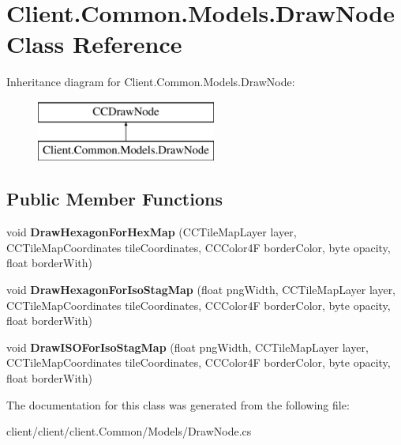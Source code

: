 \hypertarget{classClient_1_1Common_1_1Models_1_1DrawNode}{\section{Client.\-Common.\-Models.\-Draw\-Node Class Reference}
\label{classClient_1_1Common_1_1Models_1_1DrawNode}
}
Inheritance diagram for Client.\-Common.\-Models.\-Draw\-Node\-:\begin{figure}[H]
\begin{center}
\leavevmode
\includegraphics[height=2.000000cm]{classClient_1_1Common_1_1Models_1_1DrawNode}
\end{center}
\end{figure}
\subsection*{Public Member Functions}
\begin{DoxyCompactItemize}
\item 
\hypertarget{classClient_1_1Common_1_1Models_1_1DrawNode_a8acad135d936298475940d5ba6b5e4d1}{void {\bfseries Draw\-Hexagon\-For\-Hex\-Map} (C\-C\-Tile\-Map\-Layer layer, C\-C\-Tile\-Map\-Coordinates tile\-Coordinates, C\-C\-Color4\-F border\-Color, byte opacity, float border\-With)}\label{classClient_1_1Common_1_1Models_1_1DrawNode_a8acad135d936298475940d5ba6b5e4d1}

\item 
\hypertarget{classClient_1_1Common_1_1Models_1_1DrawNode_af759c63ae3fc8d138925290c91bbd41f}{void {\bfseries Draw\-Hexagon\-For\-Iso\-Stag\-Map} (float png\-Width, C\-C\-Tile\-Map\-Layer layer, C\-C\-Tile\-Map\-Coordinates tile\-Coordinates, C\-C\-Color4\-F border\-Color, byte opacity, float border\-With)}\label{classClient_1_1Common_1_1Models_1_1DrawNode_af759c63ae3fc8d138925290c91bbd41f}

\item 
\hypertarget{classClient_1_1Common_1_1Models_1_1DrawNode_a0b4fd6fccd6e7c7f0d6a889f7bcb2ea5}{void {\bfseries Draw\-I\-S\-O\-For\-Iso\-Stag\-Map} (float png\-Width, C\-C\-Tile\-Map\-Layer layer, C\-C\-Tile\-Map\-Coordinates tile\-Coordinates, C\-C\-Color4\-F border\-Color, byte opacity, float border\-With)}\label{classClient_1_1Common_1_1Models_1_1DrawNode_a0b4fd6fccd6e7c7f0d6a889f7bcb2ea5}

\end{DoxyCompactItemize}


The documentation for this class was generated from the following file\-:\begin{DoxyCompactItemize}
\item 
client/client/client.\-Common/\-Models/Draw\-Node.\-cs\end{DoxyCompactItemize}
